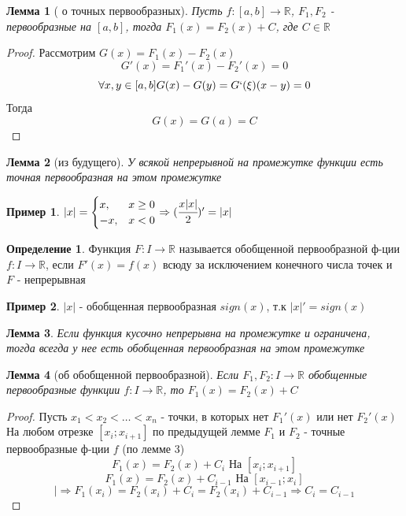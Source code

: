 \documentclass[a4paper]{article}
\newtheorem{lemma}{Лемма}
\theoremstyle{definition}
\newtheorem*{definition*}{Определение}
\newtheorem*{exmp}{Пример}
\newcommand\abs[1]{%
\mbox{$| #1 |$}}
\numberwithin{theorem}{subsection}
\numberwithin{lemma}{subsection}
\numberwithin{definition}{subsection}
\numberwithin{comment*}{subsection}
\numberwithin{consequence}{subsection}
\numberwithin{property}{subsection}
\begin{document}
\begin{lemma}[ о точных первообразных]
 Пусть $f: [a,b] \rightarrow \mathbb{R}$, $F_1, F_2$ - первообразные на $[a,b]$, тогда $F_1(x)=F_2(x)+C$, где $C \in \mathbb{R}$
\end{lemma}
\begin{proof}
 Рассмотрим $G(x) = F_1(x) - F_2(x)$
 $$ G'(x) = F_1'(x) - F_2'(x) = 0 $$
 $$ \forall{x,y} \in [a,b] G(x) - G(y)=G`(\xi)(x-y) = 0$$
 Тогда $$G(x)=G(a) = C$$
\end{proof}
\begin{lemma}[из будущего]
 У всякой непрерывной на промежутке функции есть точная первообразная на этом промежутке
\end{lemma}
\begin{exmp}
 $\abs{x} = \begin{cases}
   x,  & x\geq 0 \\
   -x, & x<0     \\
  \end{cases} \Rightarrow
  (\cfrac{x\abs{x}}{2})'=\abs{x}
 $
\end{exmp}
\begin{definition*}
 Функция $F: I \rightarrow \mathbb{R}$ называется обобщенной первообразной ф-ции $f: I \rightarrow \mathbb{R}$, если $F'(x) = f(x)$ всюду за исключением конечного числа точек и $F$ - непрерывная
\end{definition*}
\begin{exmp}
 $\abs{x}$ - обобщенная первообразная $sign(x)$, т.к $\abs{x}'=sign(x)$
\end{exmp}
\begin{lemma}
 Если функция кусочно непрерывна на промежутке и ограничена, тогда всегда у нее есть обобщенная первообразная на этом промежутке
\end{lemma}
\begin{lemma}[об обобщенной первообразной]
 Если $F_1, F_2: I \rightarrow \mathbb{R}$ обобщенные первообразные функции $f: I \rightarrow \mathbb{R}$, то $F_1(x)= F_2(x)+C$
\end{lemma}
\begin{proof}
 Пусть $x_1<x_2< \dots < x_n$ - точки, в которых нет $F_1'(x)$ или нет $F_2'(x)$\\
 На любом отрезке  $[x_i; x_{i+1}]$ по предыдущей лемме  $F_1$ и $F_2$ - точные первообразные ф-ции $f$ (по лемме 3)\\
 $$ F_1(x)=F_2(x) + C_i  \text{ На }[x_i; x_{i+1}]$$
 $$ F_1(x)=F_2(x) + C_{i-1} \text{ На }[x_{i-1}; x_{i}]$$
 $$|\Rightarrow F_1(x_i)= F_2(x_i) + C_i = F_2(x_i) + C_{i-1} \Rightarrow C_i = C_{i-1}$$
\end{proof}
\end{document}

